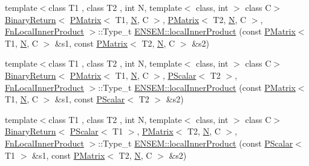 \begin{DoxyCompactItemize}
{\footnotesize template$<$class T1 , class T2 , int N, template$<$ class, int $>$ class C$>$ }\\\mbox{\hyperlink{structENSEM_1_1BinaryReturn}{Binary\+Return}}$<$ \mbox{\hyperlink{classENSEM_1_1PMatrix}{P\+Matrix}}$<$ T1, \mbox{\hyperlink{adat__devel_2lib_2hadron_2operator__name__util_8cc_a7722c8ecbb62d99aee7ce68b1752f337}{N}}, C $>$, \mbox{\hyperlink{classENSEM_1_1PMatrix}{P\+Matrix}}$<$ T2, \mbox{\hyperlink{adat__devel_2lib_2hadron_2operator__name__util_8cc_a7722c8ecbb62d99aee7ce68b1752f337}{N}}, C $>$, \mbox{\hyperlink{structENSEM_1_1FnLocalInnerProduct}{Fn\+Local\+Inner\+Product}} $>$\+::Type\+\_\+t \mbox{\hyperlink{group__primmatrix_ga8ba784b1249c948dcff5b8fe086e2eb5}{E\+N\+S\+E\+M\+::local\+Inner\+Product}} (const \mbox{\hyperlink{classENSEM_1_1PMatrix}{P\+Matrix}}$<$ T1, \mbox{\hyperlink{adat__devel_2lib_2hadron_2operator__name__util_8cc_a7722c8ecbb62d99aee7ce68b1752f337}{N}}, C $>$ \&s1, const \mbox{\hyperlink{classENSEM_1_1PMatrix}{P\+Matrix}}$<$ T2, \mbox{\hyperlink{adat__devel_2lib_2hadron_2operator__name__util_8cc_a7722c8ecbb62d99aee7ce68b1752f337}{N}}, C $>$ \&s2)
\item 
{\footnotesize template$<$class T1 , class T2 , int N, template$<$ class, int $>$ class C$>$ }\\\mbox{\hyperlink{structENSEM_1_1BinaryReturn}{Binary\+Return}}$<$ \mbox{\hyperlink{classENSEM_1_1PMatrix}{P\+Matrix}}$<$ T1, \mbox{\hyperlink{adat__devel_2lib_2hadron_2operator__name__util_8cc_a7722c8ecbb62d99aee7ce68b1752f337}{N}}, C $>$, \mbox{\hyperlink{classENSEM_1_1PScalar}{P\+Scalar}}$<$ T2 $>$, \mbox{\hyperlink{structENSEM_1_1FnLocalInnerProduct}{Fn\+Local\+Inner\+Product}} $>$\+::Type\+\_\+t \mbox{\hyperlink{group__primmatrix_gafc7ce30ddacb0b13e2db237cfa268161}{E\+N\+S\+E\+M\+::local\+Inner\+Product}} (const \mbox{\hyperlink{classENSEM_1_1PMatrix}{P\+Matrix}}$<$ T1, \mbox{\hyperlink{adat__devel_2lib_2hadron_2operator__name__util_8cc_a7722c8ecbb62d99aee7ce68b1752f337}{N}}, C $>$ \&s1, const \mbox{\hyperlink{classENSEM_1_1PScalar}{P\+Scalar}}$<$ T2 $>$ \&s2)
\item 
{\footnotesize template$<$class T1 , class T2 , int N, template$<$ class, int $>$ class C$>$ }\\\mbox{\hyperlink{structENSEM_1_1BinaryReturn}{Binary\+Return}}$<$ \mbox{\hyperlink{classENSEM_1_1PScalar}{P\+Scalar}}$<$ T1 $>$, \mbox{\hyperlink{classENSEM_1_1PMatrix}{P\+Matrix}}$<$ T2, \mbox{\hyperlink{adat__devel_2lib_2hadron_2operator__name__util_8cc_a7722c8ecbb62d99aee7ce68b1752f337}{N}}, C $>$, \mbox{\hyperlink{structENSEM_1_1FnLocalInnerProduct}{Fn\+Local\+Inner\+Product}} $>$\+::Type\+\_\+t \mbox{\hyperlink{group__primmatrix_gaaa8729c59af4a03489be7e620e3dd187}{E\+N\+S\+E\+M\+::local\+Inner\+Product}} (const \mbox{\hyperlink{classENSEM_1_1PScalar}{P\+Scalar}}$<$ T1 $>$ \&s1, const \mbox{\hyperlink{classENSEM_1_1PMatrix}{P\+Matrix}}$<$ T2, \mbox{\hyperlink{adat__devel_2lib_2hadron_2operator__name__util_8cc_a7722c8ecbb62d99aee7ce68b1752f337}{N}}, C $>$ \&s2)

\end{DoxyCompactItemize}
